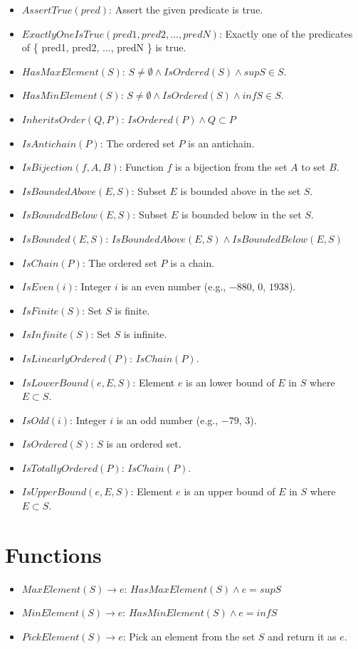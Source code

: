 \documentclass[12pt, letterpaper, oneside]{book}
\begin{document}
\begin{itemize}
  \item $AssertTrue(pred)$: Assert the given predicate is true.
  \item $ExactlyOneIsTrue(pred1, pred2, \ldots, predN)$: Exactly one of the predicates of \{ pred1, pred2, $\ldots$,
        predN \} is true.
  \item $HasMaxElement(S)$: $S \ne \emptyset \land IsOrdered(S) \land sup S \in S$.
  \item $HasMinElement(S)$: $S \ne \emptyset \land IsOrdered(S) \land inf S \in S$.
  \item $InheritsOrder(Q, P)$: $IsOrdered(P) \land Q \subset P$
  \item $IsAntichain(P)$: The ordered set $P$ is an antichain.
  \item $IsBijection(f, A, B)$: Function $f$ is a bijection from the set $A$ to set $B$.
  \item $IsBoundedAbove(E, S)$: Subset $E$ is bounded above in the set $S$.
  \item $IsBoundedBelow(E, S)$: Subset $E$ is bounded below in the set $S$.
  \item $IsBounded(E, S)$: $IsBoundedAbove(E, S) \land IsBoundedBelow(E, S)$
  \item $IsChain(P)$: The ordered set $P$ is a chain.
  \item $IsEven(i)$: Integer $i$ is an even number (e.g., $-880$, $0$, $1938$).
  \item $IsFinite(S)$: Set $S$ is finite.
  \item $IsInfinite(S)$: Set $S$ is infinite.
  \item $IsLinearlyOrdered(P)$: $IsChain(P)$.
  \item $IsLowerBound(e, E, S)$: Element $e$ is an lower bound of $E$ in $S$ where $E \subset S$.
  \item $IsOdd(i)$: Integer $i$ is an odd number (e.g., $-79$, $3$).
  \item $IsOrdered(S)$: $S$ is an ordered set.
  \item $IsTotallyOrdered(P)$: $IsChain(P)$.
  \item $IsUpperBound(e, E, S)$: Element $e$ is an upper bound of $E$ in $S$ where $E \subset S$.
\end{itemize}

%
\chapter{Functions}
%

\begin{itemize}
  \item $MaxElement(S) \rightarrow e$: $HasMaxElement(S) \land e = sup S$
  \item $MinElement(S) \rightarrow e$: $HasMinElement(S) \land e = inf S$
  \item $PickElement(S) \rightarrow e$: Pick an element from the set $S$ and return it as $e$.
\end{itemize}
\end{document}
